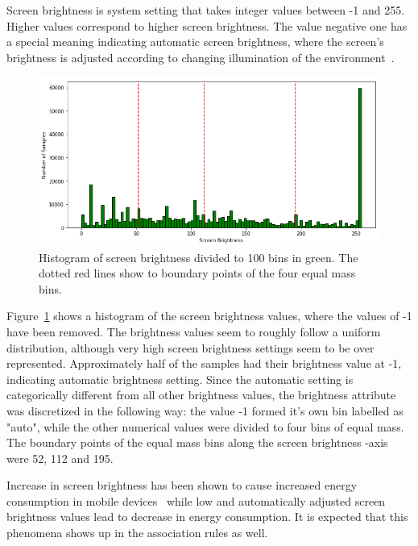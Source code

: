 Screen brightness is system setting that takes integer values between -1 and 255. Higher values correspond to higher screen brightness. The value negative one has a special meaning indicating automatic screen brightness, where the screen's brightness is adjusted according to changing illumination of the environment~\cite{PELTONEN201671}.

\begin{figure} %
	\centering
	\includegraphics[width=\textwidth]{images/carat-data/screen_brightness_w_boundaries.png}
	\caption{Histogram of screen brightness divided to 100 bins in green. The dotted red lines show to boundary points of the four equal mass bins.}
	\label{figure:carat-data-screen-brightness}
\end{figure}     

Figure~\ref{figure:carat-data-screen-brightness} shows a histogram of the screen brightness values, where the values of -1 have been removed. The brightness values seem to roughly follow a uniform distribution, although very high screen brightness settings seem to be over represented. Approximately half of the samples had their brightness value at -1, indicating automatic brightness setting. Since the automatic setting is categorically different from all other brightness values, the brightness attribute was discretized in the following way: the value -1 formed it's own bin labelled as "auto", while the other numerical values were divided to four bins of equal mass. The boundary points of the equal mass bins along the screen brightness -axis were 52, 112 and 195.   

Increase in screen brightness has been shown to cause increased energy consumption in mobile devices~\cite{5375354, PELTONEN201671} while low and automatically adjusted screen brightness values lead to decrease in energy consumption. It is expected that this phenomena shows up in the association rules as well.

